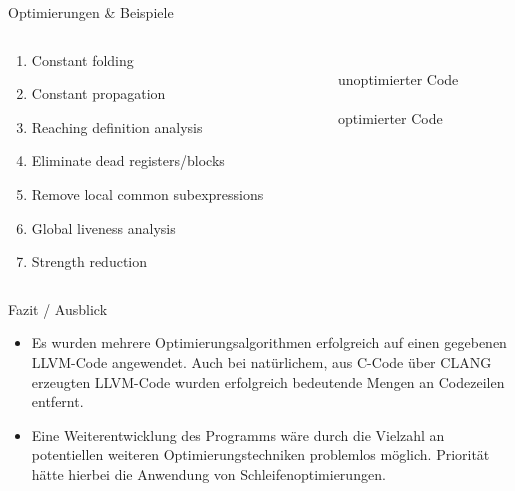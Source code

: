 \documentclass[ucs,9pt]{beamer}
\begin{document}
\begin{frame}{Optimierungen \& Beispiele}

\begin{columns}
\begin{column}{.48\textwidth}

\begin{enumerate}
\item <+-| alert@+> Constant folding
\item <+-| alert@+> Constant propagation
\item <+-| alert@+> Reaching definition analysis
\item <+-| alert@+> Eliminate dead registers/blocks
\item <+-| alert@+> Remove local common subexpressions
\item <+-| alert@+> Global liveness analysis
\item <+-| alert@+> Strength reduction
\end{enumerate}

\end{column}%
\begin{column}{.48\textwidth}

{\\
{\color{red}unoptimierter Code}\\
\vspace*{0.3cm}
\\
{\color{green}optimierter Code}}

\end{column}%
\end{columns}

\end{frame}

\begin{frame}{Fazit / Ausblick}
\begin{itemize}
\item Es wurden mehrere Optimierungsalgorithmen erfolgreich auf einen gegebenen LLVM-Code angewendet. Auch bei natürlichem, aus C-Code über CLANG erzeugten LLVM-Code wurden erfolgreich bedeutende Mengen an Codezeilen entfernt.
\vspace{3mm}
\item Eine Weiterentwicklung des Programms wäre durch die Vielzahl an potentiellen weiteren Optimierungstechniken problemlos möglich. Priorität hätte hierbei die Anwendung von Schleifenoptimierungen.
\end{itemize}
\end{frame}
\end{document}
